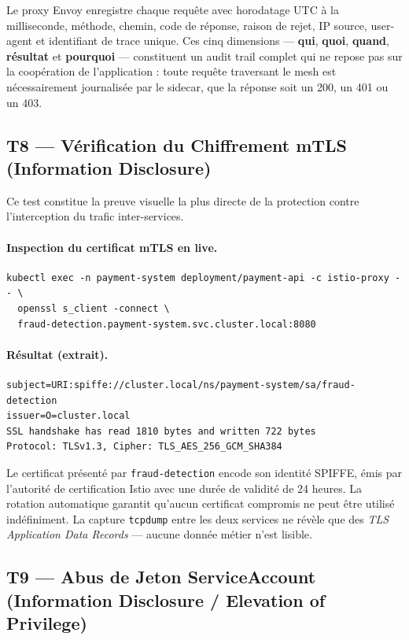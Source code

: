 Le proxy Envoy enregistre chaque requête avec horodatage UTC à la milliseconde,
méthode, chemin, code de réponse, raison de rejet, IP source, user-agent et
identifiant de trace unique. Ces cinq dimensions --- \textbf{qui}, \textbf{quoi},
\textbf{quand}, \textbf{résultat} et \textbf{pourquoi} --- constituent un audit
trail complet qui ne repose pas sur la coopération de l'application : toute
requête traversant le mesh est nécessairement journalisée par le sidecar,
que la réponse soit un 200, un 401 ou un 403.

\subsection{T8 --- Vérification du Chiffrement mTLS (Information Disclosure)}

Ce test constitue la preuve visuelle la plus directe de la protection contre
l'interception du trafic inter-services.

\paragraph{Inspection du certificat mTLS en live.}
\begin{verbatim}
kubectl exec -n payment-system deployment/payment-api -c istio-proxy -- \
  openssl s_client -connect \
  fraud-detection.payment-system.svc.cluster.local:8080
\end{verbatim}

\paragraph{Résultat (extrait).}
\begin{verbatim}
subject=URI:spiffe://cluster.local/ns/payment-system/sa/fraud-detection
issuer=O=cluster.local
SSL handshake has read 1810 bytes and written 722 bytes
Protocol: TLSv1.3, Cipher: TLS_AES_256_GCM_SHA384
\end{verbatim}

Le certificat présenté par \texttt{fraud-detection} encode son identité SPIFFE,
émis par l'autorité de certification Istio avec une durée de validité de 24 heures.
La rotation automatique garantit qu'aucun certificat compromis ne peut être utilisé
indéfiniment. La capture \texttt{tcpdump} entre les deux services ne révèle que des
\textit{TLS Application Data Records} --- aucune donnée métier n'est lisible.
\subsection{T9 --- Abus de Jeton ServiceAccount (Information Disclosure / Elevation of Privilege)}

